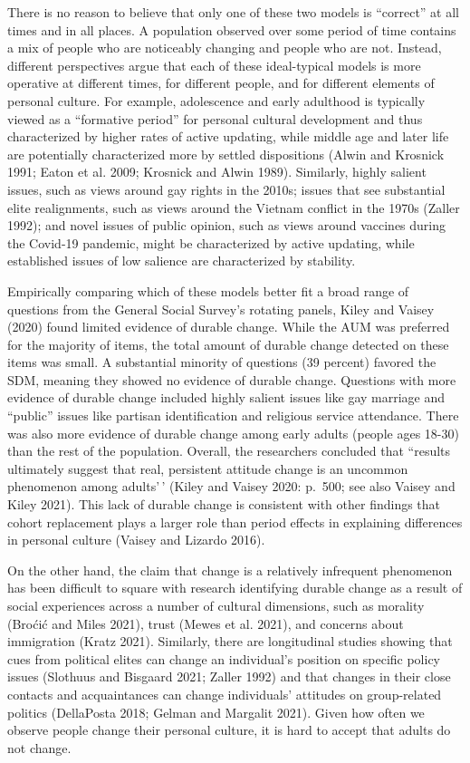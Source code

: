\documentclass[
  11pt,
]{article}
\begin{document}
There is no reason to believe that only one of these two models is
``correct'' at all times and in all places. A population observed over
some period of time contains a mix of people who are noticeably changing
and people who are not. Instead, different perspectives argue that each
of these ideal-typical models is more operative at different times, for
different people, and for different elements of personal culture. For
example, adolescence and early adulthood is typically viewed as a
``formative period'' for personal cultural development and thus
characterized by higher rates of active updating, while middle age and
later life are potentially characterized more by settled dispositions
(Alwin and Krosnick 1991; Eaton et al. 2009; Krosnick and Alwin 1989).
Similarly, highly salient issues, such as views around gay rights in the
2010s; issues that see substantial elite realignments, such as views
around the Vietnam conflict in the 1970s (Zaller 1992); and novel issues
of public opinion, such as views around vaccines during the Covid-19
pandemic, might be characterized by active updating, while established
issues of low salience are characterized by stability.

Empirically comparing which of these models better fit a broad range of
questions from the General Social Survey's rotating panels, Kiley and
Vaisey (2020) found limited evidence of durable change. While the AUM
was preferred for the majority of items, the total amount of durable
change detected on these items was small. A substantial minority of
questions (39 percent) favored the SDM, meaning they showed no evidence
of durable change. Questions with more evidence of durable change
included highly salient issues like gay marriage and ``public'' issues
like partisan identification and religious service attendance. There was
also more evidence of durable change among early adults (people ages
18-30) than the rest of the population. Overall, the researchers
concluded that ``results ultimately suggest that real, persistent
attitude change is an uncommon phenomenon among adults'\,' (Kiley and
Vaisey 2020: p.~500; see also Vaisey and Kiley 2021). This lack of
durable change is consistent with other findings that cohort replacement
plays a larger role than period effects in explaining differences in
personal culture (Vaisey and Lizardo 2016).

On the other hand, the claim that change is a relatively infrequent
phenomenon has been difficult to square with research identifying
durable change as a result of social experiences across a number of
cultural dimensions, such as morality (Broćić and Miles 2021), trust
(Mewes et al. 2021), and concerns about immigration (Kratz 2021).
Similarly, there are longitudinal studies showing that cues from
political elites can change an individual's position on specific policy
issues (Slothuus and Bisgaard 2021; Zaller 1992) and that changes in
their close contacts and acquaintances can change individuals' attitudes
on group-related politics (DellaPosta 2018; Gelman and Margalit 2021).
Given how often we observe people change their personal culture, it is
hard to accept that adults do not change.
\end{document}
